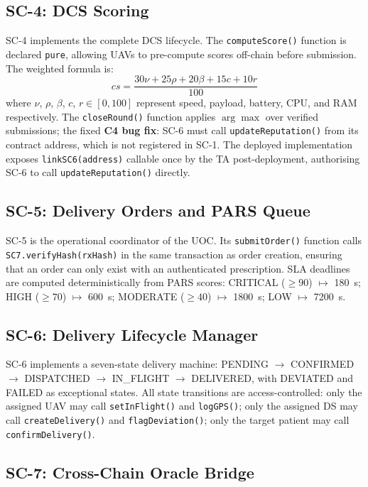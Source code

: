 \documentclass[sigplan,screen,review=false]{acmart}
\begin{document}
\subsection{SC-4: DCS Scoring}

SC-4 implements the complete DCS lifecycle. The \texttt{computeScore()}
function is declared \texttt{pure}, allowing UAVs to pre-compute scores
off-chain before submission. The weighted formula is:
\[
  cs = \frac{30\nu + 25\rho + 20\beta + 15c + 10r}{100}
\]
where $\nu$, $\rho$, $\beta$, $c$, $r \in [0, 100]$ represent speed,
payload, battery, CPU, and RAM respectively. The \texttt{closeRound()}
function applies $\arg\max$ over verified submissions; the fixed
\textbf{C4 bug fix}: SC-6 must call \texttt{updateReputation()} from
its contract address, which is not registered in SC-1. The deployed
implementation exposes \texttt{linkSC6(address)} callable once by the
TA post-deployment, authorising SC-6 to call \texttt{updateReputation()}
directly.

\subsection{SC-5: Delivery Orders and PARS Queue}

SC-5 is the operational coordinator of the UOC. Its
\texttt{submitOrder()} function calls \texttt{SC7.verifyHash(rxHash)}
in the same transaction as order creation, ensuring that an order can
only exist with an authenticated prescription. SLA deadlines are
computed deterministically from PARS scores: CRITICAL ($\geq 90$)
$\mapsto$ 180~s; HIGH ($\geq 70$) $\mapsto$ 600~s; MODERATE ($\geq 40$)
$\mapsto$ 1800~s; LOW $\mapsto$ 7200~s.

\subsection{SC-6: Delivery Lifecycle Manager}

SC-6 implements a seven-state delivery machine:
PENDING $\to$ CONFIRMED $\to$ DISPATCHED $\to$ IN\_FLIGHT $\to$ DELIVERED,
with DEVIATED and FAILED as exceptional states. All state transitions
are access-controlled: only the assigned UAV may call
\texttt{setInFlight()} and \texttt{logGPS()}; only the assigned DS
may call \texttt{createDelivery()} and \texttt{flagDeviation()};
only the target patient may call \texttt{confirmDelivery()}.

\subsection{SC-7: Cross-Chain Oracle Bridge}
\end{document}
